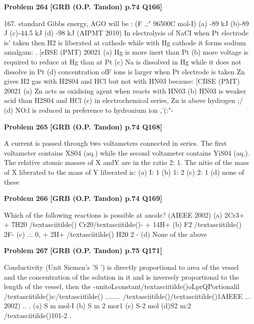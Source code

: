 \begin{problembox}
\textbf{Problem 264} \hfill \textbf{[GRB (O.P. Tandon) p.74 Q166]}
\label{q:ext-grb_all_questions-264}

167. 
standard Gibbs energy, AGO will be : 
(F ,;" 96500C mol-I) 
(a) -89 kJ 
(b)-89 J 
(c)-44.5 kJ 
(d) -98 kJ 
(AIPMT 2010) 
In electrolysis of NaCI when Pt electrode is' taken then H2 is 
liberated at cathode while with Hg cathode it forms sodium 
amalgam: 
. 
[eBSE (PMT) 20021 
(a) Hg is more inert than Pt 
(b) more voltage is required to reduce 
at Hg than at Pt 
(c) Na is dissolved in Hg while it does not dissolve in Pt 
(d) concentration ofF ions is larger when Pt electrode is taken 
Zn gives H2 gas with H2S04 and HCl but not with HN03 
because: 
[CBSE (PMT) 20021 
(a) Zn acts as oxidising agent when reacts with HN03 
(b) HN03 is weaker acid than H2S04 and HCl 
(c) in electrochemical series, Zn is above hydrogen 
;/ 
(d) NO:l is reduced in preference to hydronium ion ,'(:"-
\end{problembox}

\begin{problembox}
\textbf{Problem 265} \hfill \textbf{[GRB (O.P. Tandon) p.74 Q168]}
\label{q:ext-grb_all_questions-265}

A current is passed through two voltameters connected in 
series. The first voltameter contains XS04 (aq.) while the 
second voltameter contains YiS04 (aq.). The relative atomic 
masses of X andY are in the ratio 2: 1. The nitio of the mass of 
X liberated to the mass of Y liberated is: 
(a) I: 1 
(b) 1: 2 
(c) 2: 1 
(d) none of these
\end{problembox}

\begin{problembox}
\textbf{Problem 266} \hfill \textbf{[GRB (O.P. Tandon) p.74 Q169]}
\label{q:ext-grb_all_questions-266}

Which of the following reactions is possible at anode? 
(AIEEE 2002) 
(a) 2Cr3+ + 7H20 /textasciitilde() 
Cr20/textasciitilde()- + 14H+ 
(b) F2 /textasciitilde() 
2F-
(c) .:. 0, + 2H+ /textasciitilde() 
H20 
2 
-
(d) None of the above
\end{problembox}

\begin{problembox}
\textbf{Problem 267} \hfill \textbf{[GRB (O.P. Tandon) p.75 Q171]}
\label{q:ext-grb_all_questions-267}

Conductivity (Unit Siemen's 'S ') is directly proportional to 
area of the vessel and the concentration of the solution in it and 
is inversely proportional to the length of the vessel, then the 
-unitoLconstant/textasciitilde()oLprQPortionalil /textasciitilde()s:/textasciitilde() ........ /textasciitilde()/textasciitilde()\underline{\hspace{1cm}}1AIEEE 
... 20\underline{\hspace{1cm}}02) .. . 
(a) S m mol-I 
(b) S m 2 mor1 
(c) S-2 
mol 
(d)S2 m:2 /textasciitilde()101-2 .
\end{problembox}

